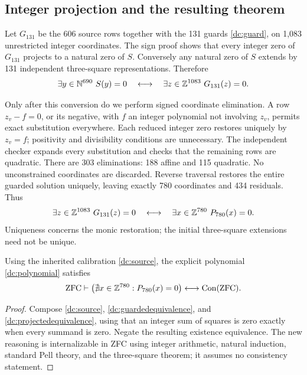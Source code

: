 \subsection{Integer projection and the resulting theorem}

Let $G_{131}$ be the 606 source rows together with the 131 guards
\eqref{dc:guard}, on 1,083 unrestricted integer coordinates.
The sign proof shows that every integer zero of $G_{131}$ projects
to a natural zero of $S$.  Conversely any natural zero of $S$ extends
by 131 independent three-square representations.  Therefore
\begin{equation}\label{dc:guardedequivalence}
 \exists y\in\mathbb N^{690}\ S(y)=0
 \quad\longleftrightarrow\quad
 \exists z\in\mathbb Z^{1083}\ G_{131}(z)=0.
\end{equation}

Only after this conversion do we perform signed coordinate elimination.
A row $z_v-f=0$, or its negative, with $f$ an integer polynomial not
involving $z_v$, permits exact substitution everywhere.  Each reduced
integer zero restores uniquely by $z_v=f$; positivity and divisibility
conditions are unnecessary.  The independent checker expands every
substitution and checks that the remaining rows are quadratic.
There are 303 eliminations: 188 affine and 115 quadratic.  No
unconstrained coordinates are discarded.  Reverse traversal restores
the entire guarded solution uniquely, leaving exactly 780 coordinates
and 434 residuals.  Thus
\begin{equation}\label{dc:projectedequivalence}
 \exists z\in\mathbb Z^{1083}\ G_{131}(z)=0
 \quad\longleftrightarrow\quad
 \exists x\in\mathbb Z^{780}\ P_{780}(x)=0.
\end{equation}
Uniqueness concerns the monic restoration; the initial three-square
extensions need not be unique.

\begin{theorem}\label{dc:main}
Using the inherited calibration \eqref{dc:source}, the explicit
polynomial \eqref{dc:polynomial} satisfies
\[
 \mathrm{ZFC}\vdash
 \bigl(\nexists x\in\mathbb Z^{780}:P_{780}(x)=0\bigr)
 \longleftrightarrow\operatorname{Con}(\mathrm{ZFC}).
\]
\end{theorem}
\begin{proof}
Compose \eqref{dc:source}, \eqref{dc:guardedequivalence}, and
\eqref{dc:projectedequivalence}, using that an integer sum of squares
is zero exactly when every summand is zero.  Negate the resulting
existence equivalence.  The new reasoning is internalizable in ZFC
using integer arithmetic, natural induction, standard Pell theory,
and the three-square theorem; it assumes no consistency statement.
\end{proof}


